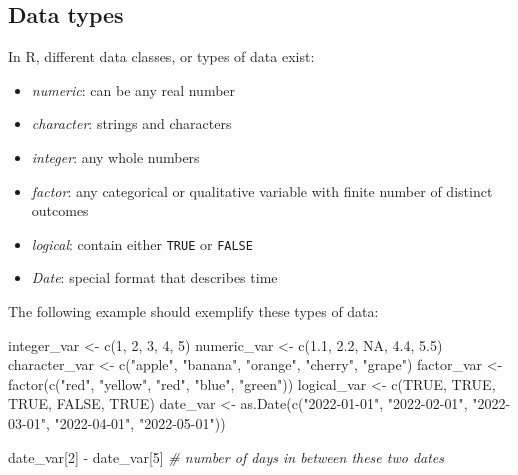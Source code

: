 \documentclass[
  12pt,
  oneside]{book}
\newenvironment{Shaded}{\begin{snugshade}}{\end{snugshade}}
\newcommand{\CommentTok}[1]{\textcolor[rgb]{0.56,0.35,0.01}{\textit{#1}}}
\newcommand{\ConstantTok}[1]{\textcolor[rgb]{0.00,0.00,0.00}{#1}}
\newcommand{\DecValTok}[1]{\textcolor[rgb]{0.00,0.00,0.81}{#1}}
\newcommand{\FloatTok}[1]{\textcolor[rgb]{0.00,0.00,0.81}{#1}}
\newcommand{\FunctionTok}[1]{\textcolor[rgb]{0.00,0.00,0.00}{#1}}
\newcommand{\NormalTok}[1]{#1}
\newcommand{\OtherTok}[1]{\textcolor[rgb]{0.56,0.35,0.01}{#1}}
\newcommand{\SpecialCharTok}[1]{\textcolor[rgb]{0.00,0.00,0.00}{#1}}
\newcommand{\StringTok}[1]{\textcolor[rgb]{0.31,0.60,0.02}{#1}}
\providecommand{\tightlist}{%
  \setlength{\itemsep}{0pt}\setlength{\parskip}{0pt}}
\theoremstyle{definition}
\theoremstyle{definition}
\theoremstyle{definition}
\theoremstyle{definition}
\theoremstyle{remark}
\begin{document}
\hypertarget{data-types}{%
\subsection{Data types}\label{data-types}}

In R, different data classes, or types of data exist:

\begin{itemize}
\tightlist
\item
  \emph{numeric}: can be any real number
\item
  \emph{character}: strings and characters
\item
  \emph{integer}: any whole numbers
\item
  \emph{factor}: any categorical or qualitative variable with finite number of distinct outcomes
\item
  \emph{logical}: contain either \texttt{TRUE} or \texttt{FALSE}
\item
  \emph{Date}: special format that describes time
\end{itemize}

The following example should exemplify these types of data:

\begin{Shaded}
\begin{Highlighting}[]
\NormalTok{integer\_var }\OtherTok{\textless{}{-}} \FunctionTok{c}\NormalTok{(}\DecValTok{1}\NormalTok{, }\DecValTok{2}\NormalTok{, }\DecValTok{3}\NormalTok{, }\DecValTok{4}\NormalTok{, }\DecValTok{5}\NormalTok{)}
\NormalTok{numeric\_var }\OtherTok{\textless{}{-}} \FunctionTok{c}\NormalTok{(}\FloatTok{1.1}\NormalTok{, }\FloatTok{2.2}\NormalTok{, }\ConstantTok{NA}\NormalTok{, }\FloatTok{4.4}\NormalTok{, }\FloatTok{5.5}\NormalTok{)}
\NormalTok{character\_var }\OtherTok{\textless{}{-}} \FunctionTok{c}\NormalTok{(}\StringTok{"apple"}\NormalTok{, }\StringTok{"banana"}\NormalTok{, }\StringTok{"orange"}\NormalTok{, }\StringTok{"cherry"}\NormalTok{, }\StringTok{"grape"}\NormalTok{)}
\NormalTok{factor\_var }\OtherTok{\textless{}{-}} \FunctionTok{factor}\NormalTok{(}\FunctionTok{c}\NormalTok{(}\StringTok{"red"}\NormalTok{, }\StringTok{"yellow"}\NormalTok{, }\StringTok{"red"}\NormalTok{, }\StringTok{"blue"}\NormalTok{, }\StringTok{"green"}\NormalTok{))}
\NormalTok{logical\_var }\OtherTok{\textless{}{-}} \FunctionTok{c}\NormalTok{(}\ConstantTok{TRUE}\NormalTok{, }\ConstantTok{TRUE}\NormalTok{, }\ConstantTok{TRUE}\NormalTok{, }\ConstantTok{FALSE}\NormalTok{, }\ConstantTok{TRUE}\NormalTok{)}
\NormalTok{date\_var }\OtherTok{\textless{}{-}} \FunctionTok{as.Date}\NormalTok{(}\FunctionTok{c}\NormalTok{(}\StringTok{"2022{-}01{-}01"}\NormalTok{, }\StringTok{"2022{-}02{-}01"}\NormalTok{, }\StringTok{"2022{-}03{-}01"}\NormalTok{, }\StringTok{"2022{-}04{-}01"}\NormalTok{, }\StringTok{"2022{-}05{-}01"}\NormalTok{))}

\NormalTok{date\_var[}\DecValTok{2}\NormalTok{] }\SpecialCharTok{{-}}\NormalTok{ date\_var[}\DecValTok{5}\NormalTok{] }\CommentTok{\# number of days in between these two dates}
\end{Highlighting}
\end{Shaded}
\end{document}
